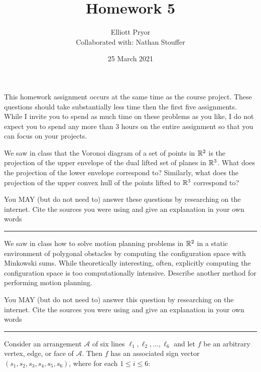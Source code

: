 \documentclass[11pt]{article}
\title{Homework 5}
\author{Elliott Pryor \\
Collaborated with: Nathan Stouffer}
\date{25 March 2021}
\newcommand{\A}{{\mathcal{A}}}
\begin{document}
\maketitle

This homework assignment occurs at the same time as the course project.  These
questions should take substantially less time then the first five assignments.
While I invite you to spend as much time on these problems as you like, I do not
expect you to spend any more than 3 hours on the entire assignment so that you
can focus on your projects.


We saw in class that the Voronoi diagram of a set of points in $\mathbb{R}^2$ is the
projection of the upper envelope of the dual lifted set of planes in $\mathbb{R}^3$.
What does the projection of the lower envelope correspond to? Similarly, what
does the projection of the upper convex hull of the points lifted to $\mathbb{R}^3$
correspond to?

You MAY (but do not need to) answer these questions by researching on the
internet. Cite the sources you were using and give an explanation in your own
words

\hrule













We saw in class how to solve motion planning problems in $\mathbb{R}^2$ in a static
environment of polygonal obstacles by computing the configuration space with
Minkowski sums.  While theoretically interesting, often, explicitly computing
the configuration space is too computationally intensive.  Describe another
method for performing motion planning.

You MAY (but do not need to) answer this question by researching on the
internet. Cite the sources you were using and give an explanation in your own
words

\hrule











Consider an arrangement $\A$ of six lines $\ell_1, \ell_2, \ldots, \ell_6$ and
let $f$ be an arbitrary vertex, edge, or face of $\A$. Then $f$ has an
associated sign vector $(s_1, s_2, s_3, s_4, s_5, s_6)$, where for each $1 \le i
\le 6$:
\end{document}
